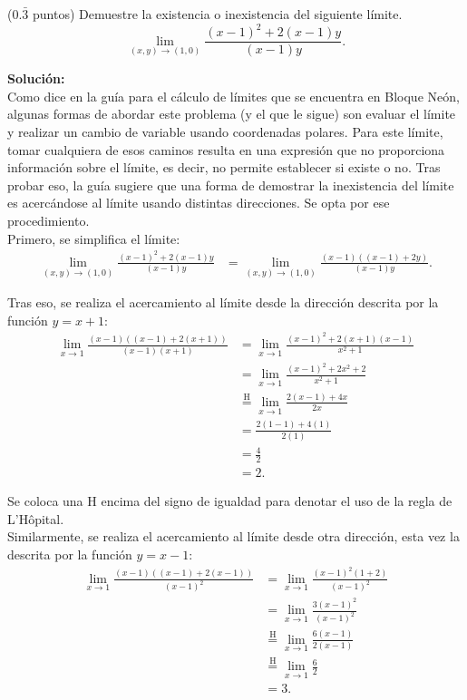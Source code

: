 \documentclass{fmbvecto}
\begin{document}
\begin{problema}

(\(0.\bar{3}\) puntos) Demuestre la existencia o inexistencia del siguiente límite.
     \[\displaystyle \lim_{(x, y) \to (1, 0)} \frac{(x-1)^2+2(x-1)y}{(x-1)y}.\]

\vspace{1em}
\tcblower
\textbf{Solución:}\\

Como dice en la guía para el cálculo de límites que se encuentra en Bloque Neón, algunas formas de abordar este problema (y el que le sigue) son evaluar el límite y realizar un cambio de variable usando coordenadas polares. Para este límite, tomar cualquiera de esos caminos resulta en una expresión que no proporciona información sobre el límite, es decir, no permite establecer si existe o no. Tras probar eso, la guía sugiere que una forma de demostrar la inexistencia del límite es acercándose al límite usando distintas direcciones. Se opta por ese procedimiento.\\

Primero, se simplifica el límite:
\begin{align*}
    \lim_{(x, y) \to (1, 0)} \frac{(x-1)^2+2(x-1)y}{(x-1)y} &= \lim_{(x, y) \to (1, 0)} \frac{(x-1)((x-1)+2y)}{(x-1)y}.
\end{align*}

Tras eso, se realiza el acercamiento al límite desde la dirección descrita por la función \(y = x+1\):
\begin{align*}
    \lim_{x \to 1} \frac{(x-1)((x-1)+2(x+1))}{(x-1)(x+1)} &= \lim_{x \to 1} \frac{(x-1)^2+2(x+1)(x-1)}{x^2+1} \\
    &= \lim_{x \to 1} \frac{(x-1)^2 + 2x^2 + 2}{x^2+1} \\
    & \stackrel{\text{H}}{=} \lim_{x \to 1} \frac{2(x-1) + 4x}{2x} \\
    &=  \frac{2(1-1) + 4(1)}{2(1)} \\
    &=  \frac{4}{2} \\
    &=  2.
\end{align*}


Se coloca una H encima del signo de igualdad para denotar el uso de la regla de L'Hôpital. \\

Similarmente, se realiza el acercamiento al límite desde otra dirección, esta vez la descrita por la función \(y = x-1\):
\begin{align*}
    \lim_{x \to 1} \frac{(x-1)((x-1)+2(x-1))}{(x-1)^2} &= \lim_{x \to 1} \frac{(x-1)^2(1+2)}{(x-1)^2} \\
    &= \lim_{x \to 1} \frac{3(x-1)^2}{(x-1)^2} \\
    & \stackrel{\text{H}}{=} \lim_{x \to 1} \frac{6(x-1)}{2(x-1)} \\
    & \stackrel{\text{H}}{=} \lim_{x \to 1} \frac{6}{2} \\
    & = 3.
\end{align*}


\end{problema}
\end{document}
